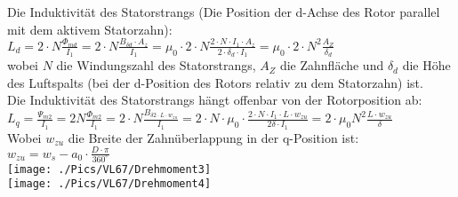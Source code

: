 \begin{minipage}{0.5 \linewidth}
Die Induktivität des Statorstrangs (Die Position der d-Achse des Rotor parallel mit dem aktivem Statorzahn): \\

$L_d = 2 \cdot N \frac{\Phi_{md}}{I_1} = 2 \cdot N \frac{B_{\delta d} \cdot A_z}{I_1} = \mu_0 \cdot 2 \cdot N \frac{2 \cdot N \cdot I_1 \cdot A_z}{2 \cdot \delta_d \cdot I_1} = \mu_0 \cdot 2 \cdot N^2 \frac{A_Z}{\delta_d}$ \\

wobei $N$ die Windungszahl des Statorstrangs, $A_Z$ die Zahnfläche und $\delta_d$ die Höhe des Luftspalts (bei der d-Position des Rotors relativ zu dem Statorzahn) ist. \\
Die Induktivität des Statorstrangs hängt offenbar von der Rotorposition ab: \\

$L_q = \frac{\Psi_{m2}}{I_1} = 2N \frac{\Phi_{m2}}{I_1} = 2 \cdot N \frac{B_{\delta2 \cdot L \cdot w_{zu}}}{I_1} = 2 \cdot N \cdot \mu_0 \cdot \frac{2 \cdot N \cdot I_1\cdot L \cdot w_{zu}}{2\delta \cdot I_1} = 2 \cdot \mu_0 N^2 \frac{L\cdot w_{zu}}{\delta}$ \\

Wobei $w_{zu}$ die Breite der Zahnüberlappung in der q-Position ist: \\

$w_{zu} = w_s - a_0 \cdot \frac{D \cdot \pi}{360^\circ} $ \\

\texttt{[image: ./Pics/VL67/Drehmoment3]} \\
\texttt{[image: ./Pics/VL67/Drehmoment4]} \\
\end{minipage}

